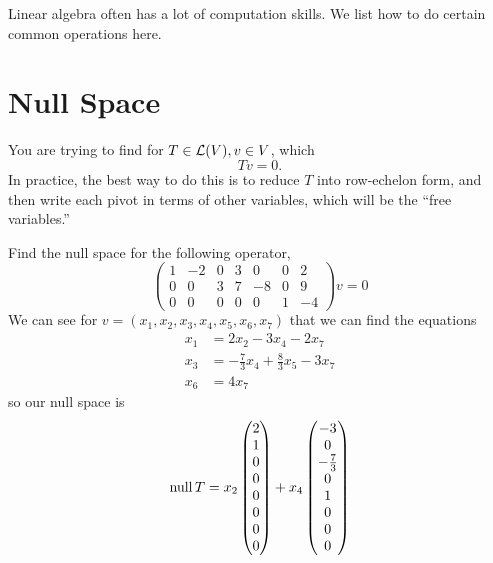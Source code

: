 Linear algebra often has a lot of computation skills. We list how to do certain common operations here.

\section{Null Space}

You are trying to find for $T \in \mathcal{L}(V), v \in V$, which
\begin{equation*}
  Tv = 0.
\end{equation*}
In practice, the best way to do this is to reduce $T$ into row-echelon form, and then write each pivot in terms of other variables, which will be the ``free variables.''

\begin{example}
  Find the null space for the following operator,
  \begin{equation*}
    \begin{pmatrix}
      1 & -2 & 0 & 3 & 0  & 0 & 2  \\
      0 & 0  & 3 & 7 & -8 & 0 & 9  \\
      0 & 0  & 0 & 0 & 0  & 1 & -4
    \end{pmatrix}v = 0
  \end{equation*}
  We can see for $v = (x_1, x_2, x_3, x_4, x_5, x_6, x_7)$ that we can find the equations
  \begin{align*}
    x_1 & = 2x_2 -3x_4 - 2x_7                       \\
    x_3 & = -\frac{7}{3}x_4 + \frac{8}{3}x_5 - 3x_7 \\
    x_6 & = 4x_7
  \end{align*}
  so our null space is
  \begin{equation*}
    \operatorname{null} T
    = x_2 \begin{pmatrix}
      2 \\ 1 \\ 0\\ 0\\ 0\\ 0\\ 0\\ 0
    \end{pmatrix} +
    x_4 \begin{pmatrix}
      -3 \\ 0 \\ -\frac{7}{3}\\ 0\\ 1\\ 0\\ 0\\ 0

\end{pmatrix}
\end{equation*}
\end{example}
